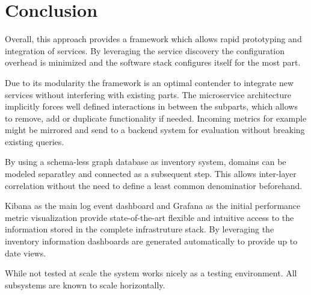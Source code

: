 \section{Conclusion}
Overall, this approach provides a framework which allows rapid prototyping and integration of services.
By leveraging the service discovery the configuration overhead is minimized and the software stack configures itself for the most part.

Due to its modularity the framework is an optimal contender to integrate new services without interfering with existing parts.
The microservice architecture implicitly forces well defined interactions in between the subparts, which allows to remove, add or duplicate functionality if needed.
Incoming metrics for example might be mirrored and send to a backend system for evaluation without breaking existing queries.

By using a schema-less graph database as inventory system, domains can be modeled separatley and connected as a subsequent step. This allows inter-layer
correlation without the need to define a least common denominatior beforehand.

Kibana as the main log event dashboard and Grafana as the initial performance metric visualization provide
state-of-the-art flexible and intuitive access to the information stored in the complete infrastruture stack.
By leveraging the inventory information dashboards are generated automatically to provide up to date views.


While not tested at scale the system works nicely as a testing environment. All subsystems are known to scale horizontally.
